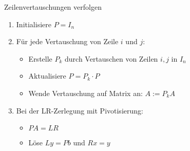 \begin{KR}{Zeilenvertauschungen verfolgen}
\begin{enumerate}
    \item Initialisiere $P = I_n$
    \item Für jede Vertauschung von Zeile $i$ und $j$:
    \begin{itemize}
        \item Erstelle $P_k$ durch Vertauschen von Zeilen $i,j$ in $I_n$
        \item Aktualisiere $P = P_k \cdot P$
        \item Wende Vertauschung auf Matrix an: $A := P_kA$
    \end{itemize}
    \item Bei der LR-Zerlegung mit Pivotisierung:
    \begin{itemize}
        \item $PA = LR$ 
        \item Löse $Ly = Pb$ und $Rx = y$
    \end{itemize}
\end{enumerate}
\end{KR}


























